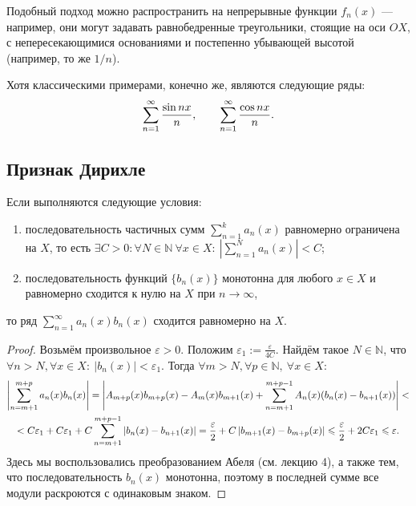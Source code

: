 	Подобный подход можно распространить на непрерывные функции $f_n(x)$ --- например, они могут задавать равнобедренные треугольники, стоящие на оси $OX$, с непересекающимися основаниями и постепенно убывающей высотой (например, то же $1/n$).
	
	Хотя классическими примерами, конечно же, являются следующие ряды:
	$$
	\sum\limits_{n=1}^{\infty} \frac{\sin nx}{n}, \qquad \sum\limits_{n=1}^{\infty} \frac{\cos nx}{n}.
	$$

	\subsection{Признак Дирихле}	
	
	\begin{Test}
		Если выполняются следующие условия:
		\begin{enumerate}
			\item  последовательность частичных сумм $\sum\limits_{n = 1}^k a_n(x) $ равномерно ограничена на $X$, то есть $\exists C>0 : \forall N\in \mathbb{N} \ \forall x \in X: \  \left| \sum\limits_{n = 1}^N a_n(x)\right|  <C$;
			
			\item  последовательность функций $\{b_n(x)\}$ монотонна для любого $x \in X$ и равномерно сходится к нулю на $X$ при $n \to \infty$,
		\end{enumerate}
		то ряд $\sum\limits_{n = 1}^\infty a_n(x) b_n(x)$ сходится равномерно на $X$.
	\end{Test}
	
	\begin{proof}
		Возьмём произвольное $\varepsilon>0$. Положим $\varepsilon_1 := \frac{\varepsilon}{4C}$. Найдём такое $N\in \mathbb{N}$, что $\forall n > N, \forall x \in X: \  \left| b_n(x) \right| < \varepsilon_1.$
		Тогда $\forall m>N, \forall p \in \mathbb{N}, \ \forall x \in X:$
		\begin{multline}
		\left| \sum\limits_{n = m+1}^{m+p} a_n(x) b_n(x)\right| = \left| A_{m+p}(x)b_{m+p}(x) - A_{m}(x)b_{m+1}(x)+ \sum\limits_{n = m+1}^{m+p-1} A_n(x)( b_n(x)-b_{n+1}(x)) \right| <\\
		< C\varepsilon_1+C\varepsilon_1+C\sum\limits_{n = m+1}^{m+p-1} | b_n(x)-b_{n+1}(x)|=\frac{\varepsilon}{2} + C\left|b_{m+1}(x) - b_{m+p}(x) \right| \leqslant \frac{\varepsilon}{2} + 2C\varepsilon_1 \leqslant \varepsilon.
		\end{multline}
		Здесь мы воспользовались преобразованием Абеля (см. лекцию 4), а также тем, что последовательность $b_n(x)$ монотонна, поэтому в последней сумме все модули раскроются с одинаковым знаком.
	\end{proof}
	
